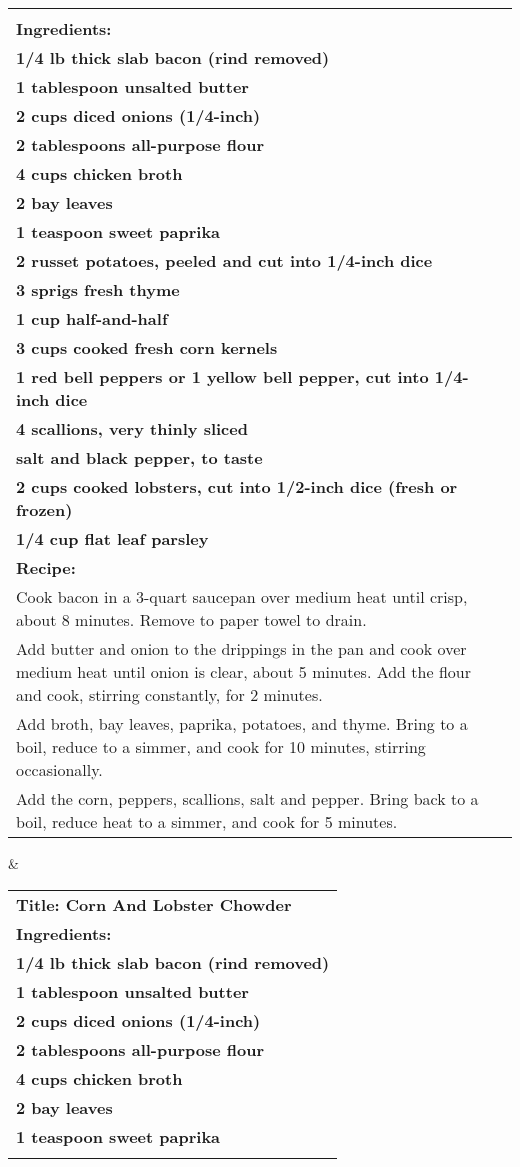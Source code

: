\begin{table*}[]
\begin{tabular}{p{.5\linewidth}p{.5\linewidth}}
\begin{tabular}[c]{@{}p{\linewidth}@{}}\textbf{*Title: Corn And Lobster Chowder}\\ \textbf{ Ingredients:}\\ \textbf{ 1/4 lb thick slab bacon (rind removed)}\\ \textbf{ 1 tablespoon unsalted butter}\\ \textbf{ 2 cups diced onions (1/4-inch)}\\ \textbf{ 2 tablespoons all-purpose flour}\\ \textbf{ 4 cups chicken broth}\\ \textbf{ 2 bay leaves}\\ \textbf{ 1 teaspoon sweet paprika}\\ \textbf{ 2 russet potatoes, peeled and cut into 1/4-inch dice}\\ \textbf{ 3 sprigs fresh thyme}\\ \textbf{ 1 cup half-and-half}\\ \textbf{ 3 cups cooked fresh corn kernels}\\ \textbf{ 1 red bell peppers or 1 yellow bell pepper, cut into 1/4-inch dice}\\ \textbf{ 4 scallions, very thinly sliced}\\ \textbf{ salt and black pepper, to taste}\\ \textbf{ 2 cups cooked lobsters, cut into 1/2-inch dice (fresh or frozen)}\\ \textbf{ 1/4 cup flat leaf parsley}\\ \textbf{ Recipe:}\\ Cook bacon in a 3-quart saucepan over medium heat until crisp, about 8 minutes. Remove to paper towel to drain.\\ Add butter and onion to the drippings in the pan and cook over medium heat until onion is clear, about 5 minutes. Add the flour and cook, stirring constantly, for 2 minutes.\\ Add broth, bay leaves, paprika, potatoes, and thyme. Bring to a boil, reduce to a simmer, and cook for 10 minutes, stirring occasionally.\\ Add the corn, peppers, scallions, salt and pepper. Bring back to a boil, reduce heat to a simmer, and cook for 5 minutes.\end{tabular} & \begin{tabular}[c]{@{}p{\linewidth}@{}}\textbf{Title: Corn And Lobster Chowder}\\ \textbf{ Ingredients:}\\ \textbf{ 1/4 lb thick slab bacon (rind removed)}\\ \textbf{ 1 tablespoon unsalted butter}\\ \textbf{ 2 cups diced onions (1/4-inch)}\\ \textbf{ 2 tablespoons all-purpose flour}\\ \textbf{ 4 cups chicken broth}\\ \textbf{ 2 bay leaves}\\ \textbf{ 1 teaspoon sweet paprika}\\ \textbf{ 2 russet potatoes, 
\end{tabular}
\end{table*}
